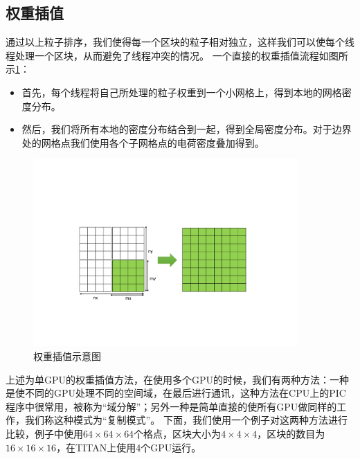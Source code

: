 \subsection{权重插值}
\label{section:PIC_GPU_depositor}
通过以上粒子排序，我们使得每一个区块的粒子相对独立，这样我们可以使每个线程处理一个区块，从而避免了线程冲突的情况。
一个直接的权重插值流程如图所示\ref{fig:PIC_combine}：
\begin{itemize}
  \item 首先，每个线程将自己所处理的粒子权重到一个小网格上，得到本地的网格密度分布。
  \item 然后，我们将所有本地的密度分布结合到一起，得到全局密度分布。对于边界处的网格点我们使用各个子网格点的电荷密度叠加得到。
\end{itemize}
\begin{figure}[!htb]
    \centering
    \includegraphics[width=0.9\textwidth]{Img/3PIC_combine.pdf}
    \caption{权重插值示意图}
    \label{fig:PIC_combine}
\end{figure}

上述为单GPU的权重插值方法，在使用多个GPU的时候，我们有两种方法：一种是使不同的GPU处理不同的空间域，在最后进行通讯，这种方法在CPU上的PIC程序中很常用，被称为“域分解”；另外一种是简单直接的使所有GPU做同样的工作，我们称这种模式为“复制模式”。
下面，我们使用一个例子对这两种方法进行比较，例子中使用$64 \times 64 \times 64$个格点，区块大小为$4 \times 4 \times 4$，区块的数目为$16 \times 16 \times 16$，在TITAN上使用4个GPU运行。

